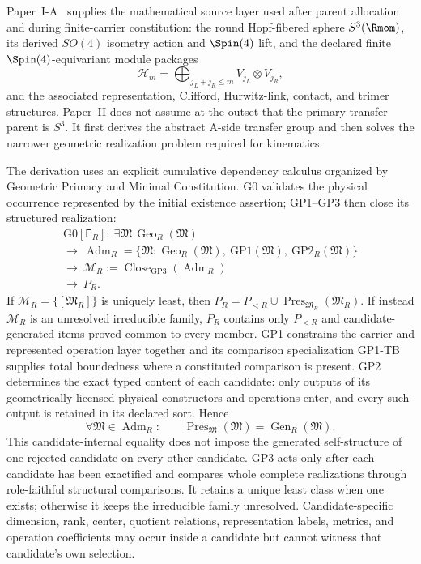 \documentclass[12pt,a4paper]{article}
\begin{document}
Paper~I-A~\cite{Kugelmann2026a} supplies the mathematical source layer used after
parent allocation and during finite-carrier constitution: the round Hopf-fibered sphere \(S^3(\Rmom)\), its derived
\(SO(4)\) isometry action and \(\Spin(4)\) lift, and the declared finite
\(\Spin(4)\)-equivariant module packages
\[
\mathcal H_m=\bigoplus_{j_L+j_R\le m}V_{j_L}\otimes V_{j_R},
\]
and the associated representation, Clifford, Hurwitz-link, contact, and trimer
structures.  Paper~II does not assume at the outset that the primary transfer parent is
\(S^3\).  It first derives the abstract A-side transfer group and
then solves the narrower geometric realization problem required
for kinematics.

The derivation uses an explicit cumulative dependency calculus organized by
Geometric Primacy and Minimal Constitution.  G0 validates the physical
occurrence represented by the initial existence assertion; GP1--GP3 then close
its structured realization:
\[
\boxed{\begin{gathered}
\mathrm{G0}[\mathsf E_R]:\ \exists\mathfrak M\,\operatorname{Geo}_R(\mathfrak M)\\
\longrightarrow\
\operatorname{Adm}_R
=\{\mathfrak M:\operatorname{Geo}_R(\mathfrak M),
\ \mathrm{GP1}(\mathfrak M),\ \mathrm{GP2}_R(\mathfrak M)\}\\
\longrightarrow\
\mathcal M_R
:=\operatorname{Close}_{\mathrm{GP3}}\!\left(\operatorname{Adm}_R\right)\\
\longrightarrow\
P_R.
\end{gathered}}
\]
If \(\mathcal M_R=\{[\mathfrak M_R]\}\) is uniquely least, then
\(P_R=P_{<R}\cup\operatorname{Pres}_{\mathfrak M_R}(\mathfrak M_R)\).
If instead \(\mathcal M_R\) is an unresolved irreducible family, \(P_R\)
contains only \(P_{<R}\) and candidate-generated items proved common to every
member.
GP1 constrains the carrier and represented operation layer together and its
comparison specialization GP1-TB supplies total boundedness where a
constituted comparison is present.  GP2 determines the exact typed content of
each candidate: only outputs of its geometrically licensed physical
constructors and operations enter, and every such output is retained in its
declared sort.  Hence
\[
 \forall\mathfrak M\in\operatorname{Adm}_R:\qquad
 \operatorname{Pres}_{\mathfrak M}(\mathfrak M)
 =\operatorname{Gen}_R(\mathfrak M).
\]
This candidate-internal equality does not impose the generated self-structure
of one rejected candidate on every other candidate.  GP3 acts only after each
candidate has been exactified and compares whole complete realizations through
role-faithful structural comparisons.  It retains a unique least class when
one exists; otherwise it keeps the irreducible family unresolved.
Candidate-specific dimension, rank, center, quotient relations,
representation labels, metrics, and operation coefficients may occur inside a
candidate but cannot witness that candidate's own selection.
\end{document}
